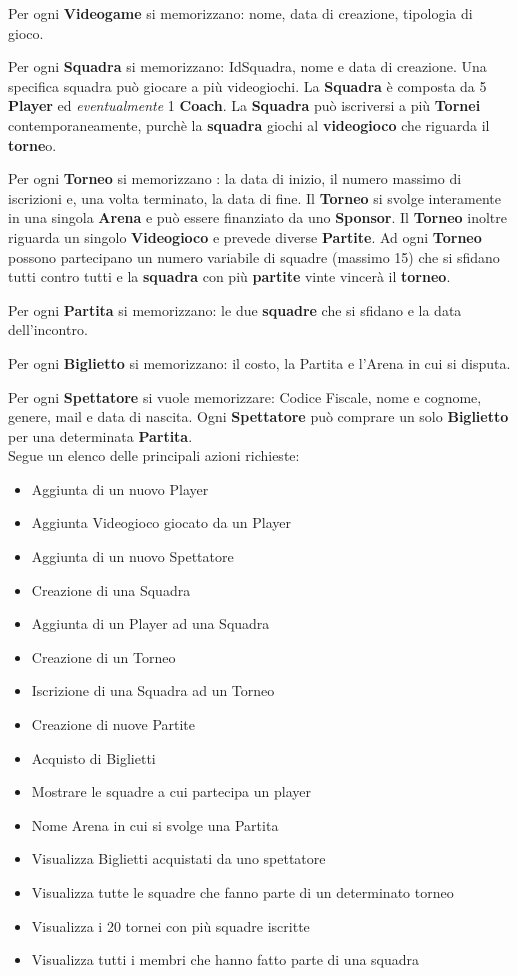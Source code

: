 \documentclass[a4paper,12pt]{report}
\begin{document}
Per ogni \textbf{Videogame} si memorizzano: nome, data di creazione, tipologia di gioco.

Per ogni \textbf{Squadra} si memorizzano: IdSquadra, nome e data di creazione. Una specifica squadra può giocare a più videogiochi. La \textbf{Squadra} è composta da 5 \textbf{Player} ed \textit{eventualmente} 1 \textbf{Coach}. La \textbf{Squadra} può iscriversi a più \textbf{Tornei} contemporaneamente, purchè la \textbf{squadra} giochi al \textbf{videogioco} che riguarda il \textbf{torne}o.

Per ogni \textbf{Torneo} si memorizzano : la data di inizio, il numero massimo di iscrizioni e, una  volta terminato, la data di fine. Il \textbf{Torneo} si svolge interamente in una singola \textbf{Arena} e può essere finanziato da uno \textbf{Sponsor}. Il \textbf{Torneo} inoltre riguarda un singolo \textbf{Videogioco} e prevede diverse \textbf{Partite}. Ad ogni \textbf{Torneo} possono partecipano un numero variabile di squadre (massimo 15) che si sfidano tutti contro tutti e la \textbf{squadra} con più \textbf{partite} vinte vincerà il \textbf{torneo}.

Per ogni \textbf{Partita} si memorizzano: le due \textbf{squadre} che si sfidano e la data dell'incontro.

Per ogni \textbf{Biglietto} si memorizzano: il costo, la Partita e l'Arena in cui si disputa.

Per ogni \textbf{Spettatore} si vuole memorizzare: Codice Fiscale, nome e cognome, genere, mail e data di nascita. Ogni \textbf{Spettatore} può comprare un solo \textbf{Biglietto} per una determinata \textbf{Partita}.\\

Segue un elenco delle principali azioni richieste:
\begin{itemize}
	\setlength\itemsep{0.1em}
	\item Aggiunta di un nuovo Player
	\item Aggiunta Videogioco giocato da un Player
	\item Aggiunta di un nuovo Spettatore
	\item Creazione di una Squadra
	\item Aggiunta di un Player ad una Squadra
	\item Creazione di un Torneo
	\item Iscrizione di una Squadra ad un Torneo
	\item Creazione di nuove Partite
	\item Acquisto di Biglietti
	\item Mostrare le squadre a cui partecipa un player
	\item Nome Arena in cui si svolge una Partita
	\item Visualizza Biglietti acquistati da uno spettatore
	\item Visualizza tutte le squadre che fanno parte di un determinato torneo
	\item Visualizza i 20 tornei con più squadre iscritte
	\item Visualizza tutti i membri che hanno fatto parte di una squadra
	
\end{itemize}
\end{document}
